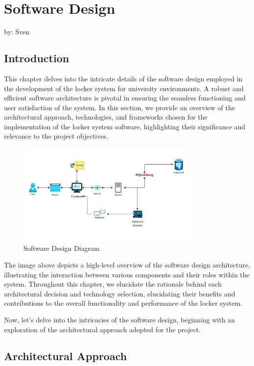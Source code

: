 \section{Software Design}
{\tinyWritten by: Sven}

\subsection{Introduction}

This chapter delves into the intricate details of the software design employed in the
development of the locker system for university environments. A robust and efficient
software architecture is pivotal in ensuring the seamless functioning and user satisfaction
of the system. In this section, we provide an overview of the architectural approach,
technologies, and frameworks chosen for the implementation of the locker system software,
highlighting their significance and relevance to the project objectives.

\begin{figure}[h]
    \centering
    \includegraphics[width=0.8\textwidth]{images/software_design_diagram}
    \caption{Software Design Diagram}
    \label{fig:software_design}
\end{figure}

The image above depicts a high-level overview of the software design architecture,
illustrating the interaction between various components and their roles within the system.
Throughout this chapter, we elucidate the rationale behind each architectural decision
and technology selection, elucidating their benefits and contributions to the overall
functionality and performance of the locker system.

Now, let's delve into the intricacies of the software design, beginning with an exploration
of the architectural approach adopted for the project.


\subsection{Architectural Approach}


